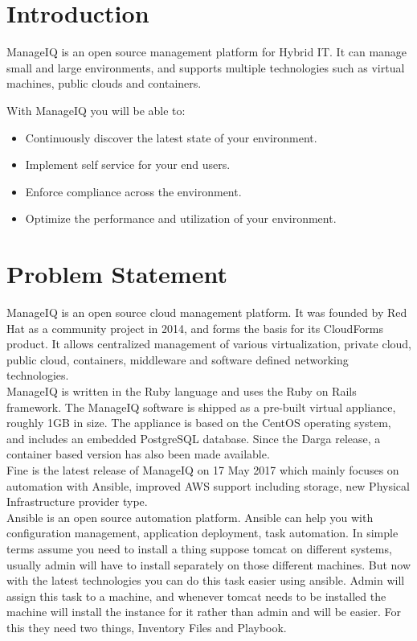 \documentclass[a4paper,12pt]{report}
\begin{document}
\tableofcontents{}

\chapter{Introduction}

ManageIQ is an open source management platform for Hybrid IT. It can manage small and large environments, and supports multiple technologies such as virtual machines, public clouds and containers.

With ManageIQ you will be able to:
\begin{itemize}
	\item Continuously discover the latest state of your environment.
	\item Implement self service for your end users.
	\item Enforce compliance across the environment.
	\item Optimize the performance and utilization of your environment.
\end{itemize}

\chapter{Problem Statement}
ManageIQ is an open source cloud management platform. It was founded by Red Hat as a community project in 2014, and forms the basis for its CloudForms product. It allows centralized management of various virtualization, private cloud, public cloud, containers, middleware and software defined networking technologies.\\

ManageIQ is written in the Ruby language and uses the Ruby on Rails framework. The ManageIQ software is shipped as a pre-built virtual appliance, roughly 1GB in size. The appliance is based on the CentOS operating system, and includes an embedded PostgreSQL database. Since the Darga release, a container based version has also been made available.\\

Fine is the latest release of ManageIQ on 17 May 2017 which mainly focuses on automation with Ansible, improved AWS support including storage, new Physical Infrastructure provider type.\\

Ansible is an open source automation platform. Ansible can help you with configuration management, application deployment, task automation. In simple terms assume you need to install a thing suppose tomcat on different systems, usually admin will have to install separately on those different machines. But now with the latest technologies you can do this task easier using ansible. Admin will assign this task to a machine, and whenever tomcat needs to be installed the machine will install the instance for it rather than admin and will be easier. For this they need two things, Inventory Files and Playbook.\\
\end{document}
